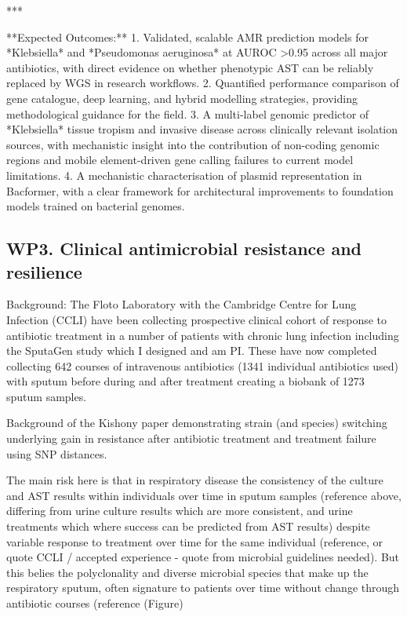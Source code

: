 \documentclass{article}
\begin{document}
***

**Expected Outcomes:**
1. Validated, scalable AMR prediction models for *Klebsiella* and *Pseudomonas aeruginosa* at AUROC >0.95 across all major antibiotics, with direct evidence on whether phenotypic AST can be reliably replaced by WGS in research workflows.
2. Quantified performance comparison of gene catalogue, deep learning, and hybrid modelling strategies, providing methodological guidance for the field.
3. A multi-label genomic predictor of *Klebsiella* tissue tropism and invasive disease across clinically relevant isolation sources, with mechanistic insight into the contribution of non-coding genomic regions and mobile element-driven gene calling failures to current model limitations.
4. A mechanistic characterisation of plasmid representation in Bacformer, with a clear framework for architectural improvements to foundation models trained on bacterial genomes.


\subsection*{WP3.  Clinical antimicrobial resistance and resilience}
Background: The Floto Laboratory with the Cambridge Centre for Lung Infection (CCLI) have been collecting prospective clinical cohort of response to antibiotic treatment in a number of patients with chronic lung infection including the SputaGen study which I designed and am PI.  
These have now completed collecting 642 courses of intravenous antibiotics (1341 individual antibiotics used) 
with sputum before during and after treatment creating a biobank of 1273 sputum samples. 

Background of the Kishony paper demonstrating strain (and species) switching underlying gain in resistance after antibiotic treatment and treatment failure using SNP distances. 

The main risk here is that in respiratory disease the consistency of the culture and AST results within individuals over time in sputum samples (reference above, differing from urine culture results which are more consistent, and urine treatments which where success can be predicted from AST results) despite variable response to treatment over time for the same individual (reference, or quote CCLI / accepted experience - quote from microbial guidelines needed). But this belies the polyclonality and diverse microbial species that make up the respiratory sputum, often signature to patients over time without change through antibiotic courses (reference (Figure)
\end{document}

